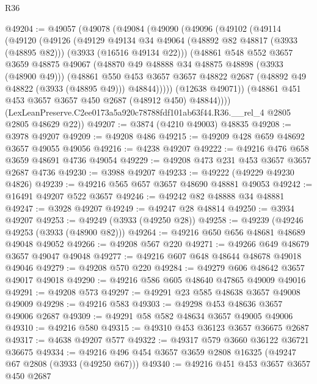 \begin{lexlean}{R36}
\begin{coremodule}
@49204 := @49057
    (@49078
      (@49084
        (@49090
          (@49096
            (@49102
              (@49114
                (@49120
                  (@49126
                    (@49129
                      @49134
                      @34
                      @49064
                      (@48892 @82 @48817 (@3933 (@48895 @82)))
                      (@3933 (@16516 @49134 @22)))
                    (@48861
                      @548
                      @552
                      @3657
                      @3659
                      @48875
                      @49067
                      (@48870 @49 @48888 @34 @48875 @48898 (@3933 (@48900 @49)))
                      (@48861
                        @550
                        @453
                        @3657
                        @3657
                        @48822
                        @2687
                        (@48892 @49 @48822 (@3933 (@48895 @49)))
                        @48844)))))
              (@12638 @49071))
            (@48861 @451 @453 @3657 @3657 @450 @2687 (@48912 @450) @48844))))
      (LexLeanPreserve.C2ee0173a5a920c78788fdf101ab63f44.R36.__rel_4 @2805 @2805 @48629 @22))
@49207 := @3874 (@4210 @49003) @48835
@49208 := @3978 @49207
@49209 := @49208 @486
@49215 := @49209 @428 @659 @48692 @3657 @49055 @49056
@49216 := @4238 @49207
@49222 := @49216 @476 @658 @3659 @48691 @4736 @49054
@49229 := @49208 @473 @231 @453 @3657 @3657 @2687 @4736
@49230 := @3988 @49207
@49233 := @49222 (@49229 @49230 @4826)
@49239 := @49216 @565 @657 @3657 @48690 @48881 @49053
@49242 := @16491 @49207 @522 @3657
@49246 := @49242 @82 @48888 @34 @48881
@49247 := @3928 @49207
@49249 := @49247 @28 @48814
@49250 := @3934 @49207
@49253 := @49249 (@3933 (@49250 @28))
@49258 := @49239 (@49246 @49253 (@3933 (@48900 @82)))
@49264 := @49216 @650 @656 @48681 @48689 @49048 @49052
@49266 := @49208 @567 @220
@49271 := @49266 @649 @48679 @3657 @49047 @49048
@49277 := @49216 @607 @648 @48644 @48678 @49018 @49046
@49279 := @49208 @570 @220
@49284 := @49279 @606 @48642 @3657 @49017 @49018
@49290 := @49216 @586 @605 @48640 @47865 @49009 @49016
@49291 := @49208 @573
@49297 := @49291 @23 @585 @48638 @3657 @49008 @49009
@49298 := @49216 @583
@49303 := @49298 @453 @48636 @3657 @49006 @2687
@49309 := @49291 @58 @582 @48634 @3657 @49005 @49006
@49310 := @49216 @580
@49315 := @49310 @453 @36123 @3657 @36675 @2687
@49317 := @4638 @49207 @577
@49322 := @49317 @579 @3660 @36122 @36721 @36675
@49334 := @49216 @496 @454 @3657 @3659 @2808 @16325 (@49247 @67 @2808 (@3933 (@49250 @67)))
@49340 := @49216 @451 @453 @3657 @3657 @450 @2687

\end{coremodule}
\end{lexlean}
